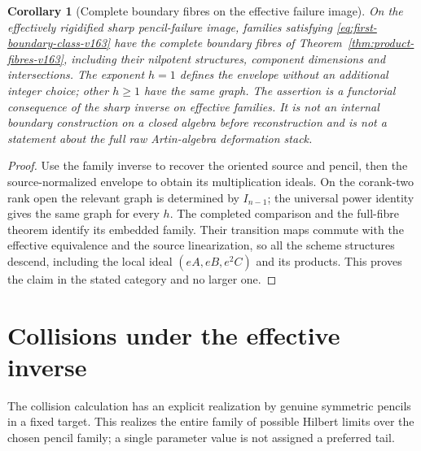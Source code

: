 \documentclass[11pt,reqno]{amsart}
\numberwithin{equation}{section}
\newtheorem{corollary}[theorem]{Corollary}
\theoremstyle{definition}\newtheorem{definition}[theorem]{Definition}
\theoremstyle{remark}\newtheorem{remark}[theorem]{Remark}
\begin{document}
\begin{corollary}[Complete boundary fibres on the effective failure image]
\label{cor:effective-full-fibres-v163}
On the effectively rigidified sharp pencil-failure image, families
satisfying \eqref{eq:first-boundary-class-v163} have the complete
boundary fibres of Theorem~\ref{thm:product-fibres-v163}, including
their nilpotent structures, component dimensions and intersections.
The exponent $h=1$ defines the envelope without an additional integer
choice; other $h\geq1$ have the same graph. The assertion is a
functorial consequence of the sharp inverse on effective families.
It is not an internal boundary construction on a closed algebra
before reconstruction and is not a statement about the full raw
Artin-algebra deformation stack.
\end{corollary}
\begin{proof}
Use the family inverse to recover the oriented source and pencil,
then the source-normalized envelope to obtain its multiplication
ideals. On the corank-two rank open the relevant graph is determined
by $I_{n-1}$; the universal power identity gives the same graph for
every $h$. The completed comparison and the full-fibre theorem
identify its embedded family. Their transition maps commute with
the effective equivalence and the source linearization, so all the
scheme structures descend, including the local ideal
$(eA,eB,e^2C)$ and its products. This proves the claim in the stated
category and no larger one.
\end{proof}


\section{Collisions under the effective inverse}
\label{sec:effective-collision-v164}
The collision calculation has an explicit realization by genuine
symmetric pencils in a fixed target. This realizes the entire family
of possible Hilbert limits over the chosen pencil family; a single
parameter value is not assigned a preferred tail.
\end{document}
